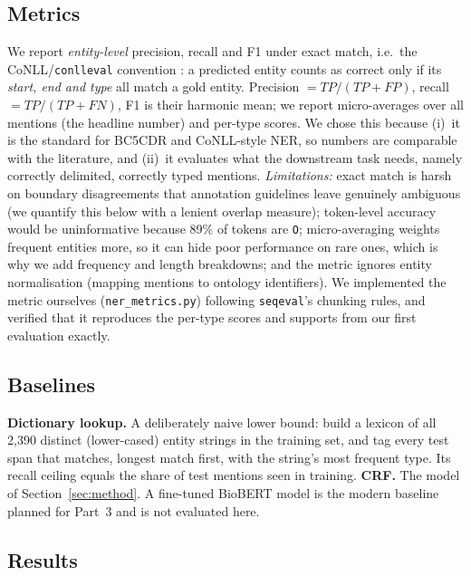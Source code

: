 \documentclass[10pt,a4paper]{article}
\begin{document}
\subsection{Metrics}\label{sec:metrics}
We report \emph{entity-level} precision, recall and F1 under exact match, i.e.\ the CoNLL/\texttt{conlleval} convention \cite{tjong2003conll}: a predicted entity counts as correct only if its
\emph{start, end and type} all match a gold entity. Precision $=TP/(TP+FP)$, recall $=TP/(TP+FN)$, F1 is their harmonic mean; we report micro-averages over all mentions
(the headline number) and per-type scores. We chose this because (i)~it is the standard for BC5CDR and CoNLL-style NER, so numbers are comparable with the literature, and
(ii)~it evaluates what the downstream task needs, namely correctly delimited, correctly typed mentions. \emph{Limitations:} exact match is harsh on boundary disagreements
that annotation guidelines leave genuinely ambiguous (we quantify this below with a lenient overlap measure); token-level accuracy would be uninformative because 89\% of tokens are \texttt{O};
micro-averaging weights frequent entities more, so it can hide poor performance on rare ones, which is why we add frequency and length breakdowns;
and the metric ignores entity normalisation (mapping mentions to ontology identifiers).
We implemented the metric ourselves (\texttt{ner\_metrics.py}) following \texttt{seqeval}'s chunking rules, and verified that it reproduces the per-type scores and supports from our first evaluation exactly.

\subsection{Baselines}
\textbf{Dictionary lookup.} A deliberately naive lower bound: build a lexicon of all 2{,}390 distinct (lower-cased) entity strings in the training set,
and tag every test span that matches, longest match first, with the string's most frequent type. Its recall ceiling equals the share of test mentions seen in training.
\textbf{CRF.} The model of Section~\ref{sec:method}. A fine-tuned BioBERT model \cite{lee2020biobert} is the modern baseline planned for Part~3 and is not evaluated here.

\subsection{Results}

\end{document}
